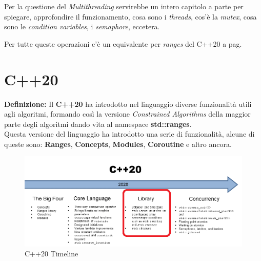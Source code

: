 \textsf{\small Per la questione del \emph{Multithreading} servirebbe un intero capitolo a parte per spiegare, approfondire il funzionamento, cosa sono i \emph{threads}, cos'è la \emph{mutex}, cosa sono le \emph{condition variables}, i \emph{semaphore}, eccetera.} \\


\fleuron

\textsf{\small Per tutte queste operazioni c'è un equivalente per \emph{ranges} del C++20 a pag. \pageref{ranges}} \\


\newpage


\section{C++20}

\textsf{\small \textbf{Definizione: } Il \textbf{C++20} ha introdotto nel linguaggio diverse funzionalità utili agli algoritmi, formando così la versione \emph{Constrained Algorithms} della maggior parte degli algoritmi dando vita al namespace \textbf{std::ranges}. } \\

\textsf{\small Questa versione del linguaggio ha introdotto una serie di funzionalità, alcune di queste sono: \textbf{Ranges}, \textbf{Concepts}, \textbf{Modules}, \textbf{Coroutine} e altro ancora.} \\

\begin{figure}[H]
	\centering
	\includegraphics[width=1\textwidth, height=1\textheight, keepaspectratio]{./imgs/TimelineCpp20_3.png}
	\caption{C++20 Timeline}
	\label{fig:TimelineCpp20_3}
\end{figure}

